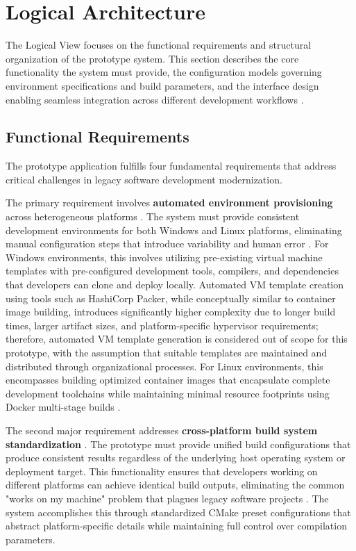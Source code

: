 \section{Logical Architecture}

The Logical View focuses on the functional requirements and structural organization of the prototype system.
This section describes the core functionality the system must provide, the configuration models governing environment specifications and build parameters, and the interface design enabling seamless integration across different development workflows \citep{kruchten4+1ViewModel1995}.

\subsection{Functional Requirements}

The prototype application fulfills four fundamental requirements that address critical challenges in legacy software development modernization.

The primary requirement involves \textbf{automated environment provisioning} across heterogeneous platforms \citep{boettigerIntroductionDockerReproducible2015}.
The system must provide consistent development environments for both Windows and Linux platforms, eliminating manual configuration steps that introduce variability and human error \citep{hungGUIdockUsingDocker2016}.
For Windows environments, this involves utilizing pre-existing virtual machine templates with pre-configured development tools, compilers, and dependencies that developers can clone and deploy locally.
Automated VM template creation using tools such as HashiCorp Packer, while conceptually similar to container image building, introduces significantly higher complexity due to longer build times, larger artifact sizes, and platform-specific hypervisor requirements; therefore, automated VM template generation is considered out of scope for this prototype, with the assumption that suitable templates are maintained and distributed through organizational processes.
For Linux environments, this encompasses building optimized container images that encapsulate complete development toolchains while maintaining minimal resource footprints using Docker multi-stage builds \citep{merkelDockerLightweightLinux2014}.

The second major requirement addresses \textbf{cross-platform build system standardization} \citep{gygiCppBuildLargeScaleAutomatic2021}.
The prototype must provide unified build configurations that produce consistent results regardless of the underlying host operating system or deployment target.
This functionality ensures that developers working on different platforms can achieve identical build outputs, eliminating the common "works on my machine" problem that plagues legacy software projects \citep{pengReproducibleResearchComputational2011}.
The system accomplishes this through standardized CMake preset configurations that abstract platform-specific details while maintaining full control over compilation parameters.

